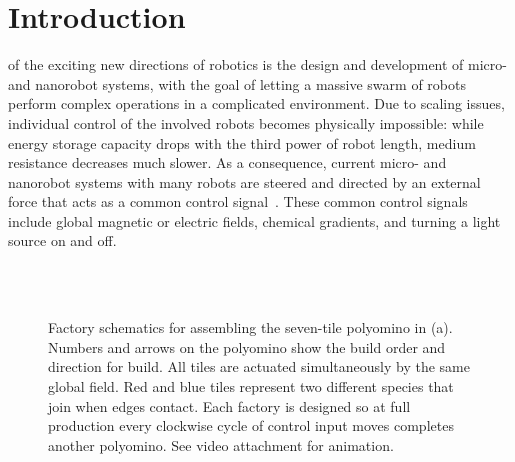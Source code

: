 \section{Introduction}\label{sec:Intro}

 of the exciting new directions of robotics is the design and development
of micro- and nanorobot systems, with the goal of letting a massive swarm of robots
perform complex operations in a complicated environment. Due to scaling 
issues, individual control of the involved robots becomes physically impossible:
while energy storage capacity drops with the third power of robot length,
medium resistance decreases much slower. As a consequence,
current micro- and nanorobot systems with many robots are steered and
directed by an external force that acts as a common control signal~\cite{Donald2013,Chiang2011,Hsi-Wen2012,Diller2013,Jing2013,Ou2013,Lanauze2013}.
These common control signals include global magnetic or electric fields,
chemical gradients, and turning a light source on and off. 

\begin{figure}
\centering
{}  \\ \vspace{-.8em}
 \\ \vspace{-.8em}      
\caption{\label{fig:factorySchematics}Factory schematics for assembling the seven-tile polyomino in (a).  Numbers and arrows on the polyomino show the build order and direction for build. All tiles are actuated simultaneously by the same global field. Red and blue tiles represent two different species that join when edges contact. Each factory is designed so at full production every clockwise cycle of control input moves completes another polyomino. See video attachment for animation.}
\end{figure}
 
